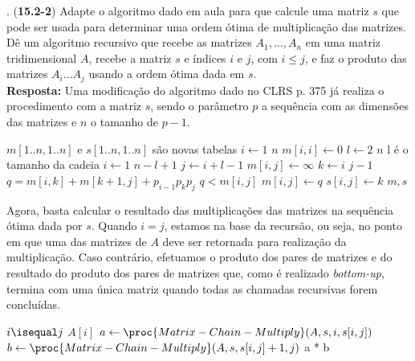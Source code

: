 
. (\textbf{15.2-2}) Adapte o algoritmo dado em aula para que calcule uma matriz $s$ que pode ser usada para determinar uma ordem ótima de multiplicação das matrizes. Dê um algoritmo recursivo que recebe as matrizes $A_1, \ldots, A_n$ em uma matriz tridimensional $A$, recebe a matriz $s$ e índices $i$ e $j$, com $i \leq j$, e faz o produto das matrizes $A_i \ldots A_j$ usando a ordem ótima dada em $s$.\\[6pt]

\textbf{Resposta:} Uma modificação do algoritmo dado no CLRS p. 375 já realiza o procedimento com a matriz $s$, sendo o parâmetro $p$ a sequência com as dimensões das matrizes e $n$ o tamanho de $p - 1$.

\begin{codebox}
\li $m[1..n, 1..n]$ e $s[1..n, 1..n]$ são novas tabelas
\li \For $i \gets 1$ \To $n$
\li \Do
        $m[i, i] \gets 0$
    \End        
\li     \For $l \gets 2$ \To $n$    \Comment l é o tamanho da cadeia
\li     \Do
            \For $i \gets 1$ \To $n - l +1$
\li         \Do
                $j \gets i + l - 1$
\li             $m[i, j] \gets \infty$
\li             \For $k \gets i$ \To $j - 1$
\li             \Do
                    $q = m[i, k] + m[k + 1, j] + p_{i-1} p_k p_j $
\li                 \If $q < m[i, j]$
\li                 \Then
                        $m[i, j] \gets q$
\li                     $s[i, j] \gets k$
                    \End
                \End
            \End
        \End
\li \Return $m, s$
\end{codebox}

Agora, basta calcular o resultado das multiplicações das matrizes na sequência ótima dada por $s$. Quando $i = j$, estamos na base da recursão, ou seja, no ponto em que uma das matrizes de $A$ deve ser retornada para realização da multiplicação. Caso contrário, efetuamos o produto dos pares de matrizes e do resultado do produto dos pares de matrizes que, como é realizado \textit{bottom-up}, termina com uma única matriz quando todas as chamadas recursivas forem concluídas. 

\begin{codebox}
\li \If $i \isequal j$
\li \Then
        \Return $A[i]$
\li \Else
        $a \gets \proc{Matrix-Chain-Multiply}(A, s, i, s[i, j])$
\li     $b \gets \proc{Matrix-Chain-Multiply}(A, s, s[i, j] + 1, j)$
\li     \Return a * b
    \End
\end{codebox}